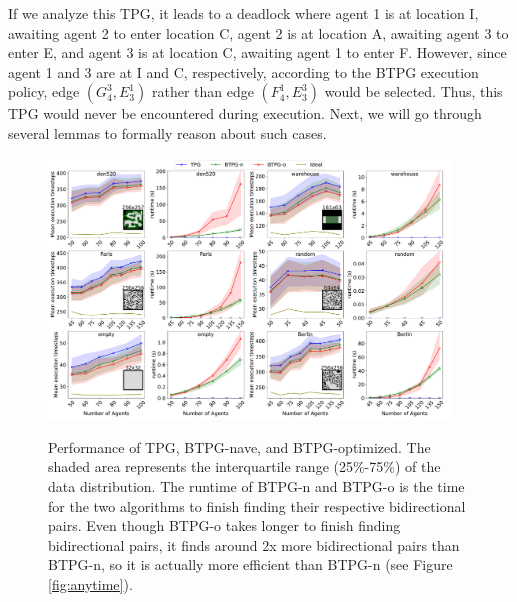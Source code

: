 \documentclass[letterpaper]{article} %
\theoremstyle{definition}
\begin{document}
If we analyze this TPG, it leads to a deadlock where agent 1 is at location I, awaiting agent 2 to enter location C, agent 2 is at location A, awaiting agent 3 to enter E, and agent 3 is at location C, awaiting agent 1 to enter F. However, since agent 1 and 3 are at I and C, respectively, according to the BTPG execution policy, edge $(G_4^3,E_3^1)$ rather than edge $(F_4^1,E_3^3)$ would be selected.
Thus, this TPG would never be encountered during execution. Next, we will go through several lemmas to formally reason about such cases.

\begin{figure}[th!]
\centering
\includegraphics[width=0.95\textwidth]{Figs/results.pdf}
\label{random}
\caption{Performance of TPG, BTPG-nave, and BTPG-optimized. The shaded area represents the interquartile range (25\%-75\%) of the data distribution. The runtime of BTPG-n and BTPG-o is the time for the two algorithms to finish finding their respective bidirectional pairs. Even though BTPG-o takes longer to finish finding bidirectional pairs, it finds around 2x more bidirectional pairs than BTPG-n, so it is actually more efficient than BTPG-n (see Figure \ref{fig:anytime}). }
\label{fig:comparison}
\end{figure}
\end{document}

